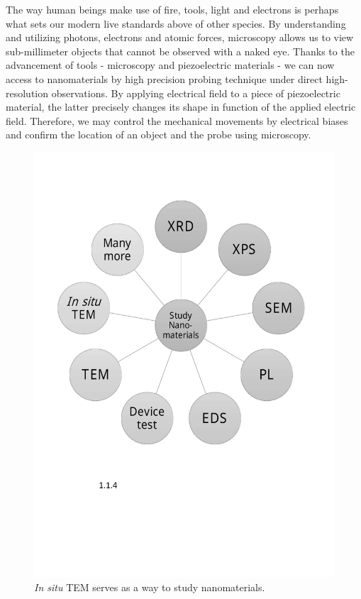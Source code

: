 The way human beings make use of fire, tools, light and electrons is perhaps what sets our modern live standards above of other species. By understanding and utilizing photons, electrons and atomic forces, microscopy allows us to view sub-millimeter objects that cannot be observed with a naked eye. Thanks to the advancement of tools - microscopy and piezoelectric materials - we can now access to nanomaterials by high precision probing technique under direct high-resolution observations. By applying electrical field to a piece of piezoelectric material, the latter precisely changes its shape in function of the applied electric field. Therefore, we may control the mechanical movements by electrical biases and confirm the location of an object and the probe using microscopy. 

\begin{figure}  
\centering
\includegraphics[width=320pt]{figures/figure1_to_study_nanomater.pdf}
\caption[Study of nanomaterials]{{\em In situ} TEM serves as a way to study nanomaterials.
\label{fig:1tsn}}
\end{figure}

